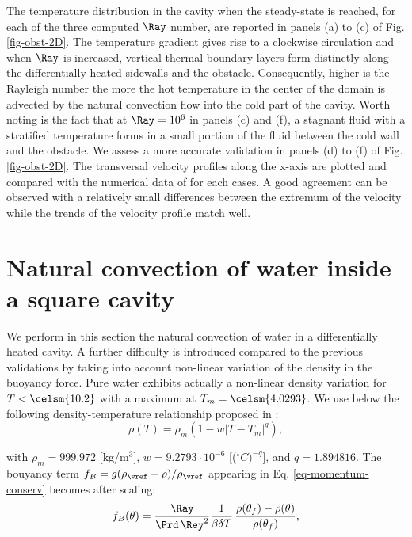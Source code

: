 The temperature distribution in the cavity when the steady-state is reached, for each of the three computed $\Ray$ number, are reported in panels (a) to (c) of Fig. \ref{fig-obst-2D}.
The temperature gradient gives rise to a clockwise circulation and when $\Ray$ is increased, vertical thermal boundary layers form distinctly along the differentially heated sidewalls and the obstacle.
Consequently, 
higher is the Rayleigh number the more the hot temperature in the center of the domain is advected by the natural convection flow into the cold part of the cavity. 
Worth noting is the fact that at $\Ray = 10^6$ in panels (c) and (f), a stagnant fluid with a stratified temperature forms in a small portion of the fluid between the cold wall and the obstacle.
We assess a more accurate validation in panels (d) to (f) of Fig. \ref{fig-obst-2D}.
The transversal velocity profiles along the x-axis are plotted and compared with the numerical data of \cite{Raluca2013} for each cases. 
A good agreement can be observed with a relatively small differences between the extremum of the velocity while the trends of the velocity profile match well.

\section{Natural convection of water inside a square cavity}\label{sec: natconv-water}
We perform in this section the natural convection of water in a differentially heated cavity. 
A further difficulty is introduced compared to the previous validations by taking into account non-linear variation of the density in the buoyancy force.
Pure water exhibits actually a non-linear density variation for $T< \celsm{10.2}$ with a maximum at $T_m= \celsm{4.0293}$. 
We use below the following density-temperature relationship  proposed in \cite{Gebhart1977}:
\begin{equation}\label{eq-dens-nonlin}
\rho(T)=\rho_m \left(1 - w \left|T - T_m\right|^q\right),
\end{equation}

\noindent with $\rho_m=999.972$ [kg/m$^3$], $w=9.2793\cdot 10^{-6}$ [($^\circ C)^{-q}$], and $q=1.894816$.
The bouyancy term $f_B = g(\rho_\vref-\rho)/\rho_\vref$ appearing in Eq. \ref{eq-momentum-conserv}  becomes after scaling:
\begin{equation}
f_B(\theta) = \frac{\Ray}{\Prd \, \Rey^2} \frac{1}{\beta \delta T}\, \frac{\rho(\theta_f)-\rho(\theta)}{\rho(\theta_f)},
\label{eq-fBnonlin}
\end{equation}


